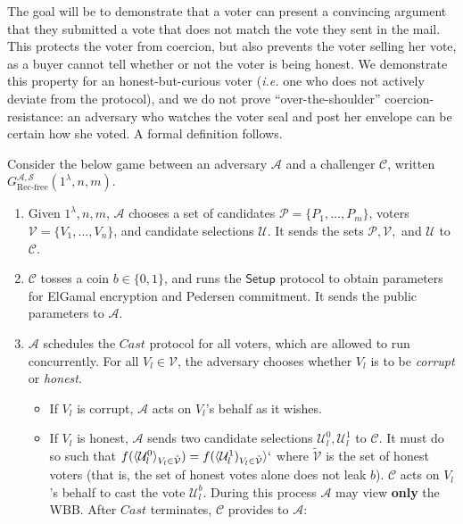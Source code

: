 \documentclass[12pt,a4paper]{article}
\theoremstyle{definition}
\newcommand{\ie}{\textit{i.e. }}
\begin{document}
The goal will be to demonstrate that a voter can present a convincing argument that they submitted a vote that does not match the vote they sent in the mail. This protects the voter from coercion, but also prevents the voter selling her vote, as a buyer cannot tell whether or not the voter is being honest. We demonstrate this property for an honest-but-curious voter (\ie one who does not actively deviate from the protocol), and we do not prove ``over-the-shoulder'' coercion-resistance: an adversary who watches the voter seal and post her envelope can be certain how she voted. A formal definition follows.
\begin{definition}
    Consider the below game between an adversary $\mathcal{A}$ and a challenger $\mathcal{C}$, written $G_{\text{Rec-free}}^{\mathcal{A},\mathcal{S}}(1^\lambda, n, m)$.
    \begin{enumerate}
        \item Given $1^\lambda, n, m$, $\mathcal{A}$ chooses a set of candidates $\mathcal{P}=\{P_1,\ldots,P_m\}$, voters $\mathcal{V}=\{V_1,\ldots,V_n\}$, and candidate selections $\mathcal{U}$. It sends the sets $\mathcal{P}, \mathcal{V},$ and $\mathcal{U}$ to $\mathcal{C}$.
        \item $\mathcal{C}$ tosses a coin $b\in\{0, 1\}$, and runs the $\mathsf{Setup}$ protocol to obtain parameters for ElGamal encryption and Pedersen commitment. It sends the public parameters to $\mathcal{A}$.
        \item $\mathcal{A}$ schedules the $\mathit{Cast}$ protocol for all voters, which are allowed to run concurrently. For all $V_l\in\mathcal{V}$, the adversary chooses whether $V_l$ is to be \textit{corrupt} or \textit{honest}.
        \begin{itemize}
            \item If $V_l$ is corrupt, $\mathcal{A}$ acts on $V_l$'s behalf as it wishes.
            \item If $V_l$ is honest, $\mathcal{A}$ sends two candidate selections $\mathcal{U}_l^0, \mathcal{U}_l^1$ to $\mathcal{C}$. It must do so such that $f(\langle\mathcal{U}_l^0\rangle_{V_l\in \tilde{\mathcal{V}}})=f(\langle\mathcal{U}^1_l)_{V_l\in \tilde{\mathcal{V}}}\rangle`$ where $\tilde{\mathcal{V}}$ is the set of honest voters (that is, the set of honest votes alone does not leak $b$). $\mathcal{C}$ acts on $V_l$'s behalf to cast the vote $\mathcal{U}_l^b$. During this process $\mathcal{A}$ may view \textbf{only} the WBB. After $\mathit{Cast}$ terminates, $\mathcal{C}$ provides to $\mathcal{A}$:

\end{itemize}
\end{enumerate}
\end{definition}
\end{document}
